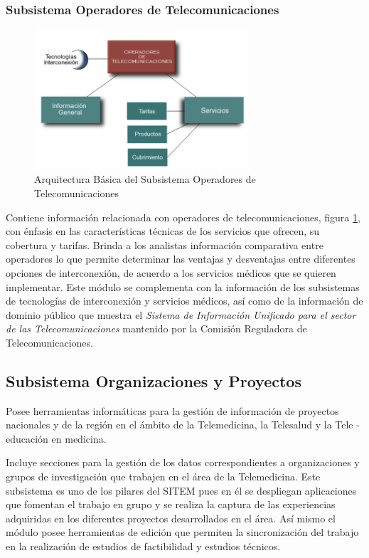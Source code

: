 \subsubsection{Subsistema Operadores de Telecomunicaciones}

\begin{figure}
 \centering
 \includegraphics[width=80mm, height=52mm]{operadores.png}
 \caption{Arquitectura Básica del Subsistema Operadores de Telecomunicaciones}
 \label{operadores}
\end{figure}

Contiene información relacionada con operadores de telecomunicaciones, figura \ref{operadores}, con énfasis en las características técnicas de los servicios que ofrecen, su cobertura y tarifas. Brinda a los analistas información comparativa entre operadores lo que permite determinar las ventajas y desventajas entre diferentes opciones de interconexión, de acuerdo a los servicios médicos que se quieren implementar. Este módulo se complementa con la información de los subsistemas de tecnologías de interconexión y servicios médicos, así como de la información de dominio público que muestra el \textit{Sistema de Información Unificado para el sector de las Telecomunicaciones} mantenido por la Comisión Reguladora de Telecomunicaciones.

\subsection{Subsistema Organizaciones y Proyectos} 

Posee herramientas informáticas para la gestión de información de proyectos nacionales y de la región en el ámbito de la Telemedicina, la Telesalud y la Tele - educación en medicina. 

Incluye secciones para la gestión de los datos correspondientes a organizaciones y grupos de investigación que trabajen en el área de la Telemedicina.  Este subsistema es uno de los pilares del SITEM pues en él se despliegan aplicaciones que fomentan el trabajo en grupo y se realiza la captura de las experiencias adquiridas en los diferentes proyectos desarrollados en el área. Así mismo el módulo posee herramientas de edición que permiten la sincronización del trabajo en la realización de estudios de factibilidad y estudios técnicos.

